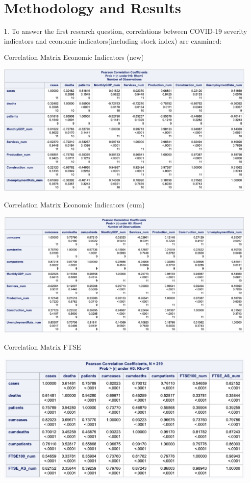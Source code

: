 \documentclass[12pt, a4paper]{report}
\begin{document}
\section{Methodology and Results}
1. To answer the first research question, correlations between COVID-19 severity indicators
and economic indicators(including stock index) are examined:

\begin{table}[H]
\centering
\caption{Correlation Matrix Economic Indicators (new)}
\includegraphics[width=13cm]{corr_economics_new.jpg}
\end{table}

\begin{table}[H]
\centering
\caption{Correlation Matrix Economic Indicators (cum)}
\includegraphics[width=13cm]{corr_economics_cum.jpg}
\end{table}

\begin{table}[H]
\centering
\caption{Correlation Matrix FTSE}
\includegraphics[width=13cm]{corr_stock.jpg}
\end{table}
\hspace*{\fill}
\end{document}
